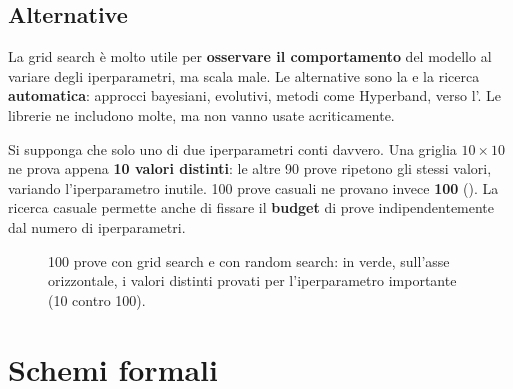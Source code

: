 \subsection{Alternative}

La grid search è molto utile per \textbf{osservare il comportamento} del modello al variare degli iperparametri,
ma scala male. Le alternative sono la  e la ricerca \textbf{automatica}: approcci
bayesiani, evolutivi, metodi come Hyperband, verso l'. Le librerie ne includono molte, ma non vanno
usate acriticamente.

\begin{idea}
Si supponga che solo uno di due iperparametri conti davvero. Una griglia $10\times10$ ne prova appena \textbf{10
valori distinti}: le altre 90 prove ripetono gli stessi valori, variando l'iperparametro inutile. 100 prove
casuali ne provano invece \textbf{100} (). La ricerca casuale permette anche di fissare il
\textbf{budget} di prove indipendentemente dal numero di iperparametri.
\end{idea}

\begin{figure}[ht]
\centering
{}
\caption{100 prove con grid search e con random search: in verde, sull'asse orizzontale, i valori distinti
provati per l'iperparametro importante (10 contro 100).}
\label{fig:grid-random}
\end{figure}

\section{Schemi formali}
\label{sec:schemi}

